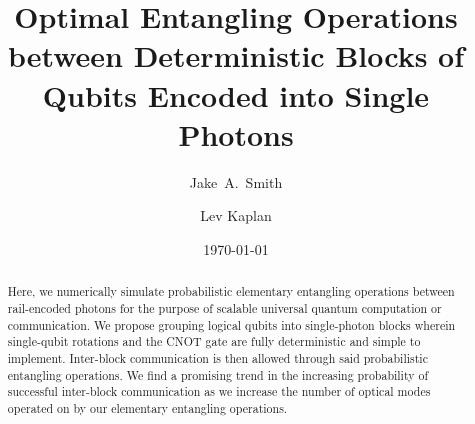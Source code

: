 \documentclass[aps,pra,twocolumn,superscriptaddress,floatfix,10pt]{revtex4}
\begin{document}
\newcommand{\beq}{\begin{equation}}
\newcommand{\eeq}{\end{equation}}
\newcommand{\ben}{\begin{eqnarray}}
\newcommand{\een}{\end{eqnarray}}
\newcommand{\bea}{\begin{array}}
\newcommand{\eea}{\end{array}}
\newcommand{\om}{(\omega )}
\newcommand{\bef}{\begin{figure}}
\newcommand{\eef}{\end{figure}}
\newcommand{\leg}[1]{\caption{\protect\rm{\protect\footnotesize{#1}}}}
\newcommand{\ew}[1]{\langle{#1}\rangle}
\newcommand{\be}[1]{\mid\!{#1}\!\mid}
\newcommand{\no}{\nonumber}
\newcommand{\etal}{{\em et~al }}
\newcommand{\geff}{g_{\mbox{\it{\scriptsize{eff}}}}}
\newcommand{\da}[1]{{#1}^\dagger}
\newcommand{\cf}{{\it cf.\/}\ }
\newcommand{\ie}{{\it i.e.\/}\ }   

\newcommand{\spazio}{\vspace{0.3cm}}%
\newcommand{\de}[1]{\frac{\partial}{\partial{#1}}}
\newcommand{\U}{\tilde{U}}
\newcommand{\V}{\tilde{V}}


\title{Optimal Entangling Operations between Deterministic Blocks of Qubits Encoded into Single Photons}

\author{Jake~A.~Smith}

\author{Lev Kaplan}

 \begin{abstract}
Here, we numerically simulate probabilistic elementary entangling operations between rail-encoded photons for the purpose of scalable universal quantum computation or communication. We propose grouping logical qubits into single-photon blocks wherein single-qubit rotations and the CNOT gate are fully deterministic and simple to implement. Inter-block communication is then allowed through said probabilistic entangling operations. We find a promising trend in the increasing probability of successful inter-block communication as we increase the number of optical modes operated on by our elementary entangling operations.
\end{abstract}                                                               
\date{\today}
\maketitle
\end{document}
